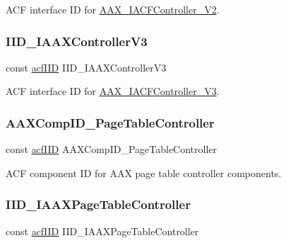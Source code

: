 A\+CF interface ID for \mbox{\hyperlink{a01641}{A\+A\+X\+\_\+\+I\+A\+C\+F\+Controller\+\_\+\+V2}}. 

\mbox{\label{a00683_ab493d5302acb8e87ac9ba19d0baa92d2}} 
\subsubsection{\texorpdfstring{IID\_IAAXControllerV3}{IID\_IAAXControllerV3}}
{\footnotesize\ttfamily const \mbox{\hyperlink{a00269_a59df0b41744eee7a066787aaedf97f67}{acf\+I\+ID}} I\+I\+D\+\_\+\+I\+A\+A\+X\+Controller\+V3}



A\+CF interface ID for \mbox{\hyperlink{a01645}{A\+A\+X\+\_\+\+I\+A\+C\+F\+Controller\+\_\+\+V3}}. 

\mbox{\label{a00683_afbda44f63aecda768b6935e79226ce63}} 
\subsubsection{\texorpdfstring{AAXCompID\_PageTableController}{AAXCompID\_PageTableController}}
{\footnotesize\ttfamily const \mbox{\hyperlink{a00269_a59df0b41744eee7a066787aaedf97f67}{acf\+I\+ID}} A\+A\+X\+Comp\+I\+D\+\_\+\+Page\+Table\+Controller}



A\+CF component ID for A\+AX page table controller components. 

\mbox{\label{a00683_a0bbba7e8b6a99bb68d2edcf4c1c06b44}} 
\subsubsection{\texorpdfstring{IID\_IAAXPageTableController}{IID\_IAAXPageTableController}}
{\footnotesize\ttfamily const \mbox{\hyperlink{a00269_a59df0b41744eee7a066787aaedf97f67}{acf\+I\+ID}} I\+I\+D\+\_\+\+I\+A\+A\+X\+Page\+Table\+Controller}



